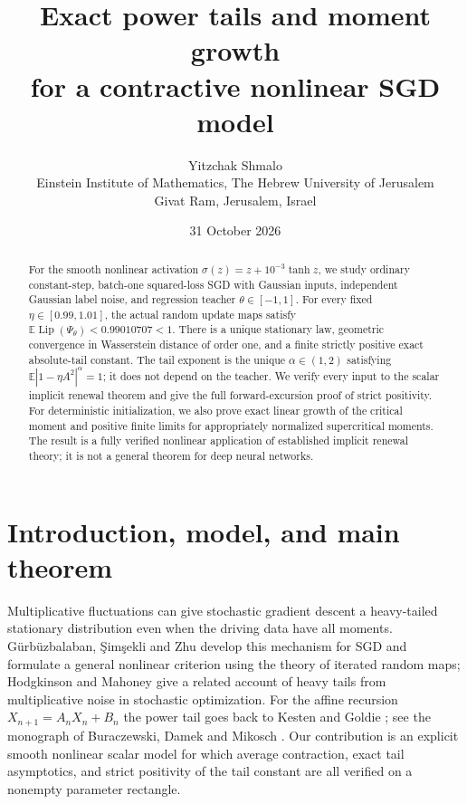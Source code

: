 \documentclass[11pt,a4paper]{article}
\title{\vspace{-1.4em}\textbf{Exact power tails and moment growth\\for a contractive nonlinear SGD model}}
\author{Yitzchak Shmalo\\[0.4em]
\small Einstein Institute of Mathematics, The Hebrew University of Jerusalem\\
\small Givat Ram, Jerusalem, Israel}
\date{31 October 2026}
\numberwithin{equation}{section}
\theoremstyle{remark}
\DeclareMathOperator{\Lip}{Lip}
\newcommand{\E}{\mathbb E}
\begin{document}
\maketitle
\thispagestyle{plain}

\begin{abstract}
For the smooth nonlinear activation $\sigma(z)=z+10^{-3}\tanh z$, we study
ordinary constant-step, batch-one squared-loss SGD with Gaussian inputs,
independent Gaussian label noise, and regression teacher $\theta\in[-1,1]$.
For every fixed $\eta\in[0.99,1.01]$, the actual random update maps satisfy
$\E\Lip(\Psi_\theta)<0.99010707<1$. There is a unique stationary law,
geometric convergence in Wasserstein distance of order one, and a finite
strictly positive exact absolute-tail constant. The tail exponent is the
unique $\alpha\in(1,2)$ satisfying $\E|1-\eta A^2|^\alpha=1$; it does not
depend on the teacher. We verify every input to the scalar implicit renewal
theorem and give the full forward-excursion proof of strict positivity.
For deterministic initialization, we also prove exact linear growth of the
critical moment and positive finite limits for appropriately normalized
supercritical moments. The result is a fully verified nonlinear application
of established implicit renewal theory; it is not a general theorem for
deep neural networks.
\end{abstract}

\section{Introduction, model, and main theorem}
\label{sec:main}

Multiplicative fluctuations can give stochastic gradient descent a
heavy-tailed stationary distribution even when the driving data have all
moments. G\"urb\"uzbalaban, \c{S}im\c{s}ekli and Zhu
\cite{Gurbuzbalaban2021} develop this mechanism for SGD and formulate a
general nonlinear criterion using the theory of iterated random maps;
Hodgkinson and Mahoney \cite{HodgkinsonMahoney2021} give a related
account of heavy tails from multiplicative noise in stochastic
optimization. For the affine recursion $X_{n+1}=A_nX_n+B_n$ the power
tail goes back to Kesten \cite{Kesten1973} and Goldie \cite{Goldie1991};
see the monograph of Buraczewski, Damek and Mikosch \cite{BDM2016}.
Our contribution is an explicit smooth nonlinear scalar model for which
average contraction, exact tail asymptotics, and strict positivity of the
tail constant are all verified on a nonempty parameter rectangle.
\end{document}
